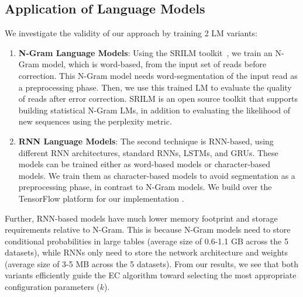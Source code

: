 
\subsection{Application of Language Models}
We investigate the validity of our approach by training 2 LM variants: 
\begin{enumerate}
\item \textbf{N-Gram Language Models}: Using the SRILM toolkit~\cite{Stolcke02srilm--}, we train an N-Gram model, which is word-based, from the input set of reads before correction. This N-Gram model needs word-segmentation of the input read as a preprocessing phase. Then, we use this trained LM to evaluate the quality of reads after error correction. SRILM is an open source toolkit that supports building statistical N-Gram LMs, in addition to evaluating the likelihood of new sequences using the perplexity metric. 

\item \textbf{RNN Language Models}: The second technique is RNN-based, using different RNN architectures, \eg standard RNNs, LSTMs, and GRUs.
These models can be trained either as word-based models or character-based models. We train them as character-based models to avoid segmentation as a preprocessing phase, in contrast to N-Gram models. We build over the TensorFlow platform for our implementation \cite{45381}.
\end{enumerate}

Further, RNN-based models have much lower memory footprint and storage requirements relative to N-Gram. This is because N-Gram models need to store conditional probabilities in large tables (average size of 0.6-1.1 GB across the 5 datasets), while RNNs only need to store the network architecture and  weights (average size of 3-5 MB across the 5 datasets). 
From our results, we see that both \name variants efficiently guide the EC algorithm toward selecting the most appropriate configuration parameters (\eg $k$). 

